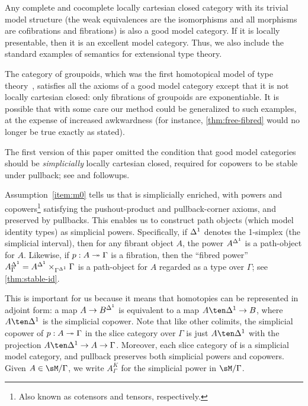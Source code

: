 \begin{eg}
Any complete and cocomplete locally cartesian closed category with its trivial model structure (the weak equivalences are the isomorphisms and all morphisms are cofibrations and fibrations) is also a good model category.
If it is locally presentable, then it is an excellent model category.
Thus, we also include the standard examples of semantics for extensional type theory.
\end{eg}

\begin{noneg}
The category of groupoids, which was the first homotopical model of type theory~\cite{hs:gpd-typethy}, satisfies all the axioms of a good model category except that it is not locally cartesian closed: only fibrations of groupoids are exponentiable.
It is possible that with some care our method could be generalized to such examples, at the expense of increased awkwardness (for instance, \cref{thm:free-fibred} would no longer be true exactly as stated).
\end{noneg}

\begin{rmk}
The first version of this paper omitted the condition that good model categories should be \emph{simplicially} locally cartesian closed, required for copowers to be stable under pullback; see \cite{MO:enriched-cccs} and followups.    
\end{rmk}

Assumption~\ref{item:m0} tells us that \sM is simplicially enriched, with powers and copowers\footnote{Also known as cotensors and tensors, respectively.} satisfying the pushout-product and pullback-corner axioms, and preserved by pullbacks.
This enables us to construct path objects (which model identity types) as simplicial powers.
Specifically, if ${\Delta^1}$ denotes the 1-simplex (the simplicial interval), then for any fibrant object $A$, the power $A^{\Delta^1}$ is a path-object for $A$.
Likewise, if $p:A\twoheadrightarrow \Gamma$ is a fibration, then the ``fibred power'' $A^{\Delta^1}_\Gamma = A^{\Delta^1} \times_{\Gamma^{\Delta^1}} \Gamma$ is a path-object for $A$ regarded as a type over $\Gamma$; see \cref{thm:stable-id}.

This is important for us because it means that homotopies can be represented in adjoint form: a map $A\to B^{\Delta^1}$ is equivalent to a map $A\ten \ivl \to B$, where $A\ten \ivl$ is the simplicial copower.
Note that like other colimits, the simplicial copower of $p:A\twoheadrightarrow \Gamma$ in the slice category over $\Gamma$ is just $A\ten\ivl$ with the projection $A\ten\ivl \to A \to \Gamma$.
Moreover, each slice category of \sM is a simplicial model category, and pullback preserves both simplicial powers and copowers.
Given $A\in\sM/\Gamma$, we write $A^K_\Gamma$ for the simplicial power in $\sM/\Gamma$.

